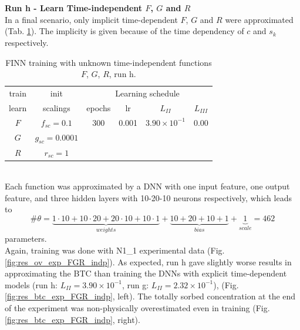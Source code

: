 \\
\\
\textbf{Run h - Learn Time-independent $F$, $G$ and $R$}\\
In a final scenario, only implicit time-dependent $F$, $G$ and $R$ were approximated (Tab. \ref{tab:FGR_exp_indp}). The implicity is given because of the time dependency of $c$ and $s_k$ respectively.
\begin{table}[h!]
    \centering
    \begin{tabular}{c|c||cccc}
    train & init & \multicolumn{4}{c}{Learning schedule}\\
    learn & scalings & epochs & lr & $L_{II}$ & $L_{III}$ \\[0.2 cm] \hline
          $F$ & $f_{sc} = 0.1$ & 300 & 0.001 & $3.90\times 10^{-1}$ & $ 0.00 $\\
          $G$ & $g_{sc} = 0.0001$ & & & &\\
          $R$ & $r_{sc} = 1$ & & & & 
        \end{tabular}
    \caption[FINN training with unknown time-independent functions $F$, $G$, $R$, run h]{FINN training with unknown time-independent functions $F$, $G$, $R$, run h.}
    \label{tab:FGR_exp_indp}
\end{table}\\
Each function was approximated by a DNN with one input feature, one output feature, and three hidden layers with 10-20-10 neurons respectively, which leads to 
\begin{equation}
    \#\theta = \underbrace{1 \cdot 10 + 10 \cdot 20 + 20 \cdot 10 + 10 \cdot 1}_{weights} + \underbrace{10 + 20 + 10 + 1}_{bias} + \underbrace{1}_{scale} = 462
\end{equation}
parameters.\\
Again, training was done with N1\_1 experimental data (Fig. \ref{fig:res_ov_exp_FGR_indp}). As expected, run h gave slightly worse results in approximating the BTC than training the DNNs with explicit time-dependent models (run h: $L_{II} = 3.90 \times 10^{-1}$, run g: $L_{II} = 2.32 \times 10^{-1}$), (Fig. \ref{fig:res_btc_exp_FGR_indp}, left). The totally sorbed concentration at the end of the experiment was non-physically overestimated even in training (Fig. \ref{fig:res_btc_exp_FGR_indp}, right).
